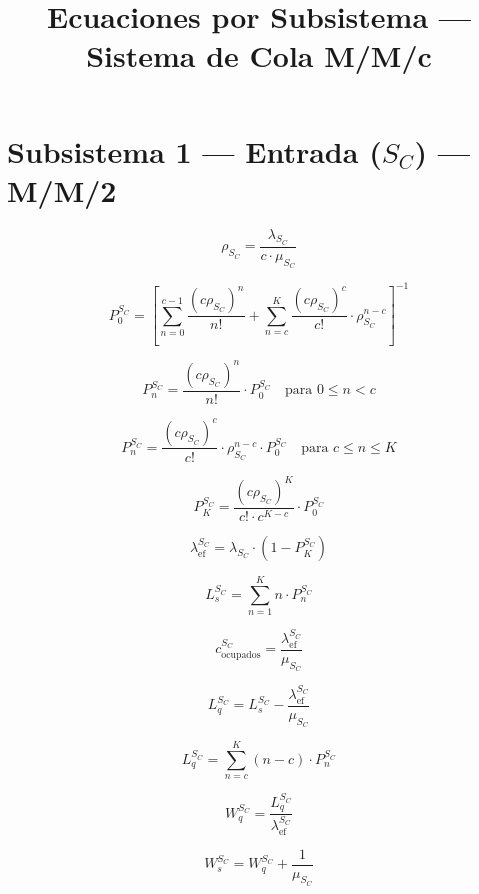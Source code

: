 \documentclass[12pt,a4paper]{article}
\title{Ecuaciones por Subsistema — Sistema de Cola M/M/c}
\author{}
\date{}
\begin{document}
\maketitle

\section*{Subsistema 1 — Entrada ($S_C$) — M/M/2}

\[
\rho_{S_C} = \frac{\lambda_{S_C}}{c \cdot \mu_{S_C}} \tag{1.1}
\]

\[
P_0^{S_C} = \left[ \sum_{n=0}^{c-1} \frac{(c\rho_{S_C})^n}{n!} + \sum_{n=c}^{K} \frac{(c\rho_{S_C})^c}{c!} \cdot \rho_{S_C}^{n-c} \right]^{-1} \tag{1.2}
\]

\[
P_n^{S_C} = \frac{(c\rho_{S_C})^n}{n!} \cdot P_0^{S_C} \quad \text{para } 0 \leq n < c \tag{1.3}
\]

\[
P_n^{S_C} = \frac{(c\rho_{S_C})^c}{c!} \cdot \rho_{S_C}^{n-c} \cdot P_0^{S_C} \quad \text{para } c \leq n \leq K \tag{1.4}
\]

\[
P_K^{S_C} = \frac{(c\rho_{S_C})^K}{c! \cdot c^{K-c}} \cdot P_0^{S_C} \tag{1.5}
\]

\[
\lambda_{\text{ef}}^{S_C} = \lambda_{S_C} \cdot (1 - P_K^{S_C}) \tag{1.6}
\]

\[
L_s^{S_C} = \sum_{n=1}^{K} n \cdot P_n^{S_C} \tag{1.7}
\]

\[
c_{\text{ocupados}}^{S_C} = \frac{\lambda_{\text{ef}}^{S_C}}{\mu_{S_C}} \tag{1.8}
\]

\[
L_q^{S_C} = L_s^{S_C} - \frac{\lambda_{\text{ef}}^{S_C}}{\mu_{S_C}} \tag{1.9}
\]

\[
L_q^{S_C} = \sum_{n=c}^{K} (n - c) \cdot P_n^{S_C} \tag{1.10}
\]

\[
W_q^{S_C} = \frac{L_q^{S_C}}{\lambda_{\text{ef}}^{S_C}} \tag{1.11}
\]

\[
W_s^{S_C} = W_q^{S_C} + \frac{1}{\mu_{S_C}} \tag{1.12}
\]
\end{document}
